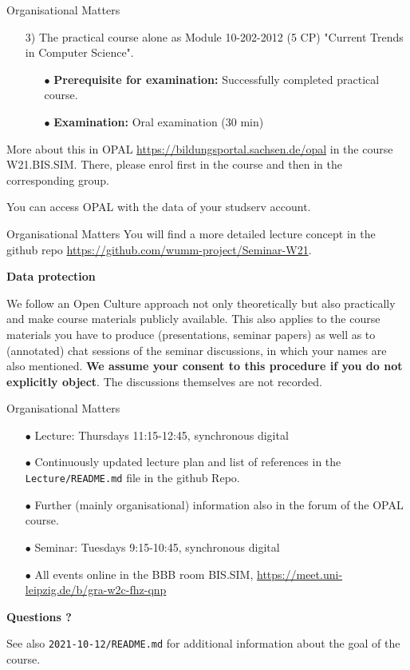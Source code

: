 \documentclass{beamer}
\newcommand{\ueberschrift}[1]{\begin{center}\bf #1\end{center}}
\begin{document}
\begin{frame}{Organisational Matters}
\begin{itemize}
\item[3)] The practical course alone as Module 10-202-2012 (5 CP) "Current
  Trends in Computer Science".
  \begin{itemize}[noitemsep]
  \item[$\bullet$] \textbf{Prerequisite for examination:} Successfully
    completed practical course.
  \item[$\bullet$] \textbf{Examination:} Oral examination (30 min)
  \end{itemize}
\end{itemize}
More about this in OPAL \url{https://bildungsportal.sachsen.de/opal} in the
course W21.BIS.SIM.  There, please enrol first in the course and then in the
corresponding group.

You can access OPAL with the data of your studserv account.

\end{frame}

\begin{frame}{Organisational Matters}
You will find a more detailed lecture concept in the github repo
\url{https://github.com/wumm-project/Seminar-W21}.

\ueberschrift{Data protection}

We follow an Open Culture approach not only theoretically but also practically
and make course materials publicly available. This also applies to the course
materials you have to produce (presentations, seminar papers) as well as to
(annotated) chat sessions of the seminar discussions, in which your names are
also mentioned. \textbf{We assume your consent to this procedure if you do not
  explicitly object}. The discussions themselves are not recorded.

\end{frame}

\begin{frame}{Organisational Matters}

\begin{itemize}
\item[$\bullet$] Lecture: Thursdays 11:15-12:45, synchronous digital
\item[$\bullet$] Continuously updated lecture plan and list of references in
  the \texttt{Lecture/README.md} file in the github Repo.  
\item[$\bullet$] Further (mainly organisational) information also in the forum
  of the OPAL course.
\item[$\bullet$] Seminar: Tuesdays 9:15-10:45, synchronous digital
\item[$\bullet$] All events online in the BBB room BIS.SIM,
  \url{https://meet.uni-leipzig.de/b/gra-w2c-fhz-qnp}
\end{itemize}
\begin{center}\LARGE\bf
  Questions ?
\end{center}

See also \texttt{2021-10-12/README.md} for additional information about the
goal of the course. 

\end{frame}
\end{document}
